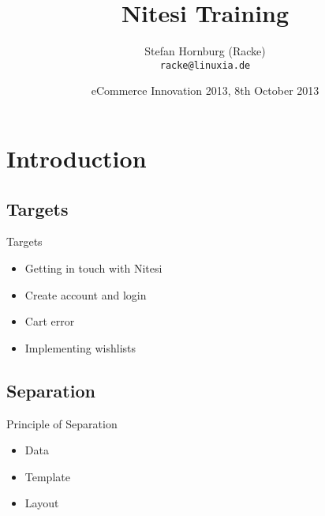 \usepackage[utf8]{inputenc}
\usepackage[T1]{fontenc}
\usepackage{mathptmx}
\usepackage[scaled=.90]{helvet}
\usepackage{courier}
\usepackage{caption}
\captionsetup{labelformat=empty,labelsep=none}
\usepackage{beamerthemesplit}
\usepackage{verbatim}
\usepackage{hyperref}
\usepackage{listings}
\lstset{language=Perl,basicstyle=\normalsize,tabsize=3,showstringspaces=false}

\title{Nitesi Training}
\author[racke]{Stefan Hornburg (Racke)\\ \texttt{racke@linuxia.de}}
\date{eCommerce Innovation 2013, 8th October 2013}


\maketitle{}

\begin{frame}
  \titlepage
\end{frame}

\tableofcontents

\section{Introduction}

\subsection{Targets}
\begin{frame}{Targets}
\begin{itemize}
\item Getting in touch with Nitesi
\item Create account and login
\item Cart error
\item Implementing wishlists
\end{itemize}
\end{frame}

\subsection{Separation}
\begin{frame}{Principle of Separation}
\begin{itemize}
\item Data
\item Template
\item Layout
\end{itemize}
\end{frame}

